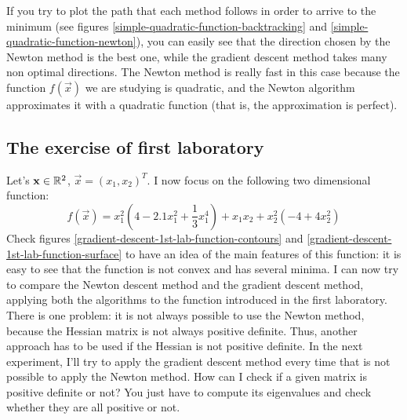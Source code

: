         If you try to plot the path that each method follows in order to arrive to the minimum (see figures \ref{simple-quadratic-function-backtracking} and \ref{simple-quadratic-function-newton}), you can easily see that the direction chosen by the Newton method is the best one, while the gradient descent method takes many non optimal directions. The Newton method is really fast in this case because the function \(f(\vec{x})\) we are studying is quadratic, and the Newton algorithm approximates it with a quadratic function (that is, the approximation is perfect).
        \subsection{The exercise of first laboratory}
            Let's \(\mathbf{x} \in \mathbb{R}^2\), \(\vec{x} = (x_1, x_2)^T\). I now focus on the following two dimensional function:
            \[f(\vec{x}) = x_1^2(4 - 2.1x_1^2 + \frac{1}{3}x_1^4) + x_1x_2 + x_2^2(-4 + 4x_2^2)\]
            Check figures \ref{gradient-descent-1st-lab-function-contours} and \ref{gradient-descent-1st-lab-function-surface} to have an idea of the main features of this function: it is easy to see that the function is not convex and has several minima. I can now try to compare the Newton descent method and the gradient descent method, applying both the algorithms to the function introduced in the first laboratory. There is one problem: it is not always possible to use the Newton method, because the Hessian matrix is not always positive definite. Thus, another approach has to be used if the Hessian is not positive definite. In the next experiment, I'll try to apply the gradient descent method every time that is not possible to apply the Newton method. How can I check if a given matrix is positive definite or not? You just have to compute its eigenvalues and check whether they are all positive or not.\par
